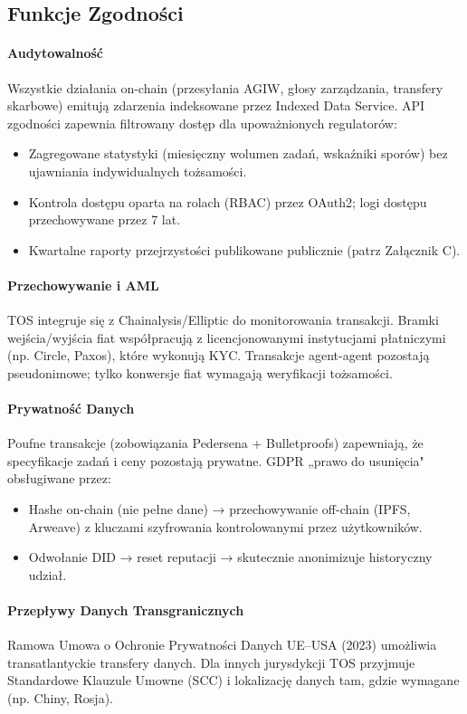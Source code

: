 \documentclass[11pt]{article}
\begin{document}
\subsection{Funkcje Zgodności}

\paragraph{Audytowalność}
Wszystkie działania on-chain (przesyłania AGIW, głosy zarządzania, transfery skarbowe) emitują zdarzenia indeksowane przez Indexed Data Service. API zgodności zapewnia filtrowany dostęp dla upoważnionych regulatorów:
\begin{itemize}[noitemsep]
  \item Zagregowane statystyki (miesięczny wolumen zadań, wskaźniki sporów) bez ujawniania indywidualnych tożsamości.
  \item Kontrola dostępu oparta na rolach (RBAC) przez OAuth2; logi dostępu przechowywane przez 7 lat.
  \item Kwartalne raporty przejrzystości publikowane publicznie (patrz Załącznik C).
\end{itemize}

\paragraph{Przechowywanie i AML}
TOS integruje się z Chainalysis/Elliptic do monitorowania transakcji. Bramki wejścia/wyjścia fiat współpracują z licencjonowanymi instytucjami płatniczymi (np. Circle, Paxos), które wykonują KYC. Transakcje agent-agent pozostają pseudonimowe; tylko konwersje fiat wymagają weryfikacji tożsamości.

\paragraph{Prywatność Danych}
Poufne transakcje (zobowiązania Pedersena + Bulletproofs) zapewniają, że specyfikacje zadań i ceny pozostają prywatne. GDPR „prawo do usunięcia" obsługiwane przez:
\begin{itemize}[noitemsep]
  \item Hashe on-chain (nie pełne dane) → przechowywanie off-chain (IPFS, Arweave) z kluczami szyfrowania kontrolowanymi przez użytkowników.
  \item Odwołanie DID → reset reputacji → skutecznie anonimizuje historyczny udział.
\end{itemize}

\paragraph{Przepływy Danych Transgranicznych}
Ramowa Umowa o Ochronie Prywatności Danych UE--USA (2023) umożliwia transatlantyckie transfery danych. Dla innych jurysdykcji TOS przyjmuje Standardowe Klauzule Umowne (SCC) i lokalizację danych tam, gdzie wymagane (np. Chiny, Rosja).
\end{document}
